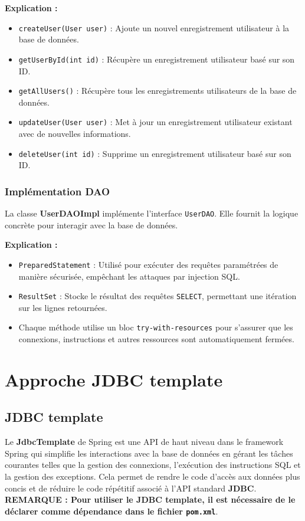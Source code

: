 \documentclass{article}
\begin{document}
\textbf{Explication :}
\begin{itemize}
    \item \texttt{createUser(User user)} : Ajoute un nouvel enregistrement utilisateur à la base de données.
    \item \texttt{getUserById(int id)} : Récupère un enregistrement utilisateur basé sur son ID.
    \item \texttt{getAllUsers()} : Récupère tous les enregistrements utilisateurs de la base de données.
    \item \texttt{updateUser(User user)} : Met à jour un enregistrement utilisateur existant avec de nouvelles informations.
    \item \texttt{deleteUser(int id)} : Supprime un enregistrement utilisateur basé sur son ID.
\end{itemize}

\subsubsection{Implémentation DAO}

La classe \textbf{UserDAOImpl} implémente l'interface \texttt{UserDAO}. Elle fournit la logique concrète pour interagir avec la base de données.

\textbf{Explication :}
\begin{itemize}
    \item \texttt{PreparedStatement} : Utilisé pour exécuter des requêtes paramétrées de manière sécurisée, empêchant les attaques par injection SQL.
    \item \texttt{ResultSet} : Stocke le résultat des requêtes \texttt{SELECT}, permettant une itération sur les lignes retournées.
    \item Chaque méthode utilise un bloc \texttt{try-with-resources} pour s'assurer que les connexions, instructions et autres ressources sont automatiquement fermées.
\end{itemize}
\section{Approche JDBC template}

\subsection{JDBC template} 
Le \textbf{JdbcTemplate} de Spring est une API de haut niveau dans le framework Spring qui simplifie les interactions avec la base de données en gérant les tâches courantes telles que la gestion des connexions, l'exécution des instructions SQL et la gestion des exceptions. Cela permet de rendre le code d'accès aux données plus concis et de réduire le code répétitif associé à l'API standard \textbf{JDBC}.
\\
\textbf{REMARQUE : Pour utiliser le JDBC template, il est nécessaire de le déclarer comme dépendance dans le fichier \texttt{pom.xml}}.
\end{document}
